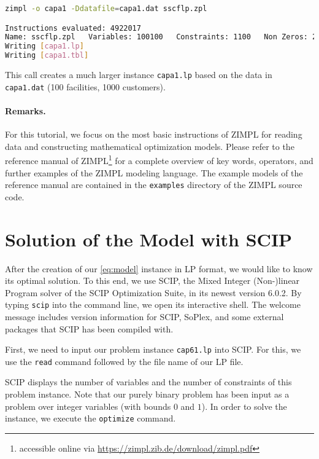\documentclass[a4paper,10pt]{article}
\begin{document}
\begin{lstlisting}[language=bash,caption=ZIMPL command line invokation with options]
zimpl -o capa1 -Ddatafile=capa1.dat sscflp.zpl

Instructions evaluated: 4922017
Name: sscflp.zpl   Variables: 100100   Constraints: 1100   Non Zeros: 200100
Writing [capa1.lp]
Writing [capa1.tbl]
\end{lstlisting}

This call creates a much larger instance \texttt{capa1.lp} based on the data in \texttt{capa1.dat} (100 facilities, 1000 customers).


\paragraph{Remarks.}

For this tutorial, we focus on the most basic instructions of ZIMPL for reading data and constructing mathematical optimization models.
Please refer to the reference manual of ZIMPL\footnote{accessible online via \url{https://zimpl.zib.de/download/zimpl.pdf}} for a complete overview of key words, operators, and further examples of the ZIMPL modeling language.
The example models of the reference manual are contained in the \texttt{examples} directory of the ZIMPL source code.


\section{Solution of the Model with SCIP}

After the creation of our \eqref{eq:model} instance in LP format, we would like to know its optimal solution.
%
To this end, we use SCIP, the Mixed Integer (Non-)linear Program solver of the SCIP Optimization Suite, in its newest version 6.0.2.
%
By typing \texttt{scip} into the command line, we open its interactive shell.
%
The welcome message includes version information for SCIP, SoPlex, and some external packages that SCIP has been compiled with.
%




First, we need to input our problem instance \texttt{cap61.lp} into SCIP.
%
For this, we use the \texttt{read} command followed by the file name of our LP file.




SCIP displays the number of variables and the number of constraints of this problem instance.
%
Note that our purely binary problem has been input as a problem over integer variables (with bounds $0$ and $1$).
%
In order to solve the instance, we execute the \texttt{optimize} command.
\end{document}
